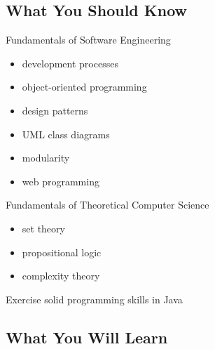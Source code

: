 \subsection{What You Should Know}

\begin{frame}{\myframetitle{}}
	\begin{fancycolumns}
		\begin{note}{Fundamentals of Software Engineering}
			\begin{itemize}
				\item development processes
				\item object-oriented programming
				\item design patterns
				\item UML class diagrams
				\item modularity
				\item web programming
			\end{itemize}
		\end{note}
		\nextcolumn
		\begin{note}{Fundamentals of Theoretical Computer Science}
			\begin{itemize}
				\item set theory
				\item propositional logic
				\item complexity theory
			\end{itemize}
		\end{note}
		\begin{note}{Exercise}
			solid programming skills in Java
			
		\end{note}
	\end{fancycolumns}
\end{frame}

\subsection{What You Will Learn}

\begin{frame}{\myframetitle{}}
	\footnotesize	\lectureseriesoverview[1]
\end{frame}

